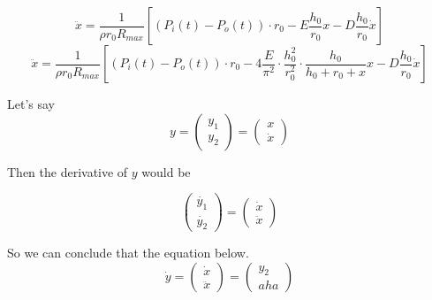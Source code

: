 \documentclass[12pt]{report}
\begin{document}
$$\ddot{x}=\frac{1}{\rho r_0 R_{max}}\left [(P_i(t)-P_o(t))\cdot r_0-E\frac{h_0}{r_0}x-D\frac{h_0}{r_0}\dot{x}\right ]$$
$$\ddot{x}=\frac{1}{\rho r_0 R_{max}}\left [(P_i(t)-P_o(t))\cdot r_0-4 \frac{E}{\pi^2}\cdot\frac{h_0^2}{r_0^2}\cdot\frac{h_0}{h_0+r_0+x}x-D\frac{h_0}{r_0}\dot{x}\right ]$$

Let's say
\begin{equation}
y=\begin{pmatrix}y_1\\y_2\end{pmatrix}=\begin{pmatrix}x\\\dot{x}\end{pmatrix}
\label{eq:1}
\end{equation}


Then the derivative of $y$ would be

\begin{equation}
\begin{pmatrix}\dot{y_1}\\\dot{y_2}\end{pmatrix}=\begin{pmatrix}\dot{x}\\\ddot{x}\end{pmatrix}
\label{eq:2}
\end{equation} 

So we can conclude that the equation below.
\begin{equation} \dot{y}=\begin{pmatrix}\dot{x}\\\ddot{x}\end{pmatrix}=\begin{pmatrix}y_2\\aha\end{pmatrix}
\label{eq:3}
\end{equation} 
\end{document}
